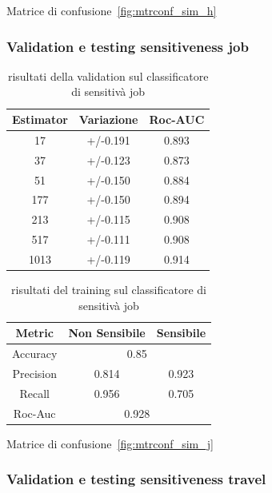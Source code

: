 Matrice di confusione~\ref{fig:mtrconf_sim_h}

\subsubsection{Validation e testing sensitiveness job}
\label{sssec:val_testing_job}

\begin{table}[h]
\label{tbl:val_sens_job}
\centering
\begin{tabular}{|c|c|c|}
\hline
\textbf{Estimator} & \textbf{Variazione} & \textbf{Roc-AUC} \\ \hline
17 & +/-0.191 & 0.893 \\ \hline
37 & +/-0.123 & 0.873 \\ \hline
51 & +/-0.150 & 0.884 \\ \hline
177 & +/-0.150 & 0.894 \\ \hline
213 & +/-0.115 & 0.908 \\ \hline
517 & +/-0.111 & 0.908 \\ \hline
1013 & +/-0.119 & 0.914 \\ \hline
\end{tabular}
\caption{risultati della validation sul classificatore di sensitivà job}
\end{table}
\FloatBarrier

\begin{table}[h]
\label{tbl:training_sens_job}
\centering
\begin{tabular}{|c|c|c|}
\hline
\textbf{Metric} & \textbf{Non Sensibile} & \textbf{Sensibile} \\ \hline
Accuracy & \multicolumn{2}{c|}{0.85} \\ \hline
Precision & 0.814 & 0.923 \\ \hline
Recall & 0.956 & 0.705 \\ \hline
Roc-Auc & \multicolumn{2}{c|}{0.928} \\ \hline
\end{tabular}
\caption{risultati del training sul classificatore di sensitivà job}
\end{table}
\FloatBarrier

Matrice di confusione~\ref{fig:mtrconf_sim_j}

\subsubsection{Validation e testing sensitiveness travel}
\label{sssec:val_testing_travel}

